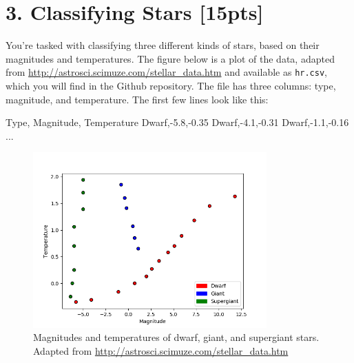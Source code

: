 \documentclass[submit]{harvardml}
\begin{document}
\section*{3. Classifying Stars [15pts]}
You're tasked with classifying three different kinds of stars, based
on their magnitudes and temperatures.  The figure below is a plot of
the data, adapted from
\url{http://astrosci.scimuze.com/stellar_data.htm} and available as
\verb|hr.csv|, which you will find in the Github repository.
The file has three columns: type, magnitude, and temperature. The
first few lines look like this:
\begin{csv}
Type, Magnitude, Temperature
Dwarf,-5.8,-0.35
Dwarf,-4.1,-0.31
Dwarf,-1.1,-0.16
...
\end{csv}
\begin{figure}[h]
\centering
\includegraphics[width=0.8\textwidth]{star}
\caption{Magnitudes and temperatures of dwarf, giant, and supergiant stars. Adapted from \url{http://astrosci.scimuze.com/stellar_data.htm}}
\end{figure}
\end{document}
